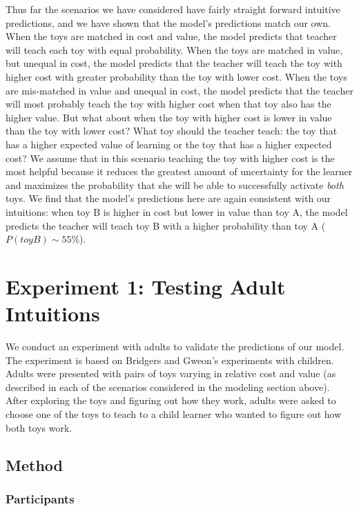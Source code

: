 \documentclass[10pt,letterpaper]{article}
\begin{document}
Thus far the scenarios we have considered have fairly straight forward intuitive predictions, and we have shown that the model's predictions match our own. When the toys are matched in cost and value, the model predicts that teacher will teach each toy with equal probability. When the toys are matched in value, but unequal in cost, the model predicts that the teacher will teach the toy with higher cost with greater probability than the toy with lower cost. When the toys are mis-matched in value and unequal in cost, the model predicts that the teacher will most probably teach the toy with higher cost when that toy also has the higher value. But what about when the toy with higher cost is lower in value than the toy with lower cost? What toy should the teacher teach: the toy that has a higher expected value of learning or the toy that has a higher expected cost? We assume that in this scenario teaching the toy with higher cost is the most helpful because it reduces the greatest amount of uncertainty for the learner and maximizes the probability that she will be able to successfully activate \textit{both} toys. We find that the model's predictions here are again consistent with our intuitions: when toy B is higher in cost but lower in value than toy A, the model predicts the teacher will teach toy B with a higher probability than toy A ($P(toyB) \sim 55\%$).

\section{Experiment 1: Testing Adult Intuitions}

We conduct an experiment with adults to validate the predictions of our model. The experiment is based on Bridgers and Gweon's experiments with children. Adults were presented with pairs of toys varying in relative cost and value (as described in each of the scenarios considered in the modeling section above). After exploring the toys and figuring out how they work, adults were asked to choose one of the toys to teach to a child learner who wanted to figure out how both toys work. 

\subsection{Method}

\subsubsection{Participants}
\end{document}

